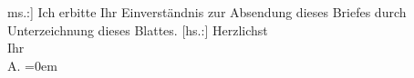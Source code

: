 \begin{ledgroupsized}[t]{13cm}
           \noindent{}{[}ms.:{]} Ich erbitte Ihr Einverständnis zur Absendung dieses
               Briefes durch Unterzeichnung dieses Blattes.\pend
           \pstart
           {[}hs.:{]} Herzlichst{\\[\baselineskip]}Ihr{\\[\baselineskip]}\spacefill\mbox{A.}\pend
           \leftskip=0em{}\endnumbering{}\end{ledgroupsized}  \newcommand{\dateiname}{L02410}\newcommand{\titel}{Arthur Schnitzler an Richard Beer-Hofmann, 27. 2. 1924}\newcommand{\editorInnen}{Martin Anton Müller und Gerd-Hermann Susen}
      